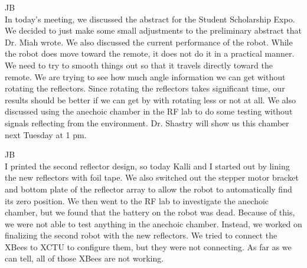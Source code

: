 \documentclass[fontsize=11pt, %
                             paper=letter, %
                             openany, %
                             captions=tableheading,
                             index=totoc,
                             hyperref]{labbook}
\begin{document}
\begin{addmargin}[0cm]{0cm}
JB\\
In today's meeting, we discussed the abstract for the Student Scholarship Expo. We decided to just make some small adjustments to the preliminary abstract that Dr. Miah wrote. We also discussed the current performance of the robot. While the robot does move toward the remote, it does not do it in a practical manner. We need to try to smooth things out so that it travels directly toward the remote. We are trying to see how much angle information we can get without rotating the reflectors. Since rotating the reflectors takes significant time, our results should be better if we can get by with rotating less or not at all. We also discussed using the anechoic chamber in the RF lab to do some testing without signals reflecting from the environment. Dr. Shastry will show us this chamber next Tuesday at 1 pm.

JB\\
I printed the second reflector design, so today Kalli and I started out by lining the new reflectors with foil tape. We also switched out the stepper motor bracket and bottom plate of the reflector array to allow the robot to automatically find its zero position. We then went to the RF lab to investigate the anechoic chamber, but we found that the battery on the robot was dead. Because of this, we were not able to test anything in the anechoic chamber. Instead, we worked on finalizing the second robot with the new reflectors. We tried to connect the XBees to XCTU to configure them, but they were not connecting. As far as we can tell, all of those XBees are not working.

\end{addmargin}











\end{document}

